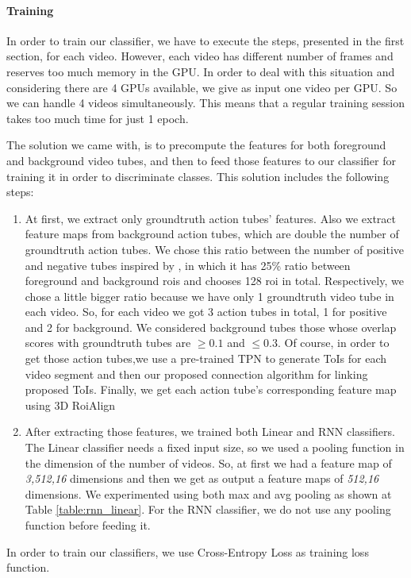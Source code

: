 \documentclass{report}
\begin{document}
\paragraph{Training}
In order to train our classifier, we have to execute the steps, presented in the first section, for each video. However, each video
has different number of frames and reserves too much memory in the GPU. In order to deal with this situation and considering there are
4 GPUs available,
we give as input one video per GPU. So we can handle 4 videos simultaneously. This means that a regular
training session takes too much time for just 1 epoch. \par
The solution we came with, is to precompute the features for both foreground  and background video tubes, and 
then to feed those features to our classifier for training  it in order to discriminate classes. This solution includes the following steps:
\begin{enumerate}
\item  At first, we extract only groundtruth action tubes’ features. Also we extract feature maps from  background action tubes, which
  are double the number of groundtruth action tubes. We chose this
ratio between the number of  positive and negative tubes inspired by \cite{jjfaster2rcnn}, in which it has 25\% ratio between foreground
and background rois and chooses 128 roi in total. Respectively, we chose a little bigger ratio because we have only 1 groundtruth
video tube in each video. So, for each video we got 3 action  tubes in total, 1 for positive and 2 for background. We considered
background tubes those whose overlap scores with groundtruth tubes are $ \ge 0.1 $ and $ \le 0.3 $. Of course, 
in order to get those action tubes,we use a pre-trained TPN to generate ToIs for each video segment and then our proposed connection
algorithm for linking proposed ToIs. Finally, we get each action tube's corresponding feature map using 3D RoiAlign

\item After extracting those features, we trained both Linear and RNN classifiers. The Linear classifier needs a fixed input size, so
  we used a pooling function in the dimension of the number of videos. So, at first we had a feature map of \textit{3,512,16} dimensions and then
  we get as output a feature maps of \textit{512,16} dimensions. We experimented using  both max and avg pooling as shown at Table \ref{table:rnn_linear}.
  For the RNN classifier, we do not use any pooling function before feeding it.
\end{enumerate}
In order to train our classifiers, we use Cross-Entropy Loss as training loss function.
\end{document}

